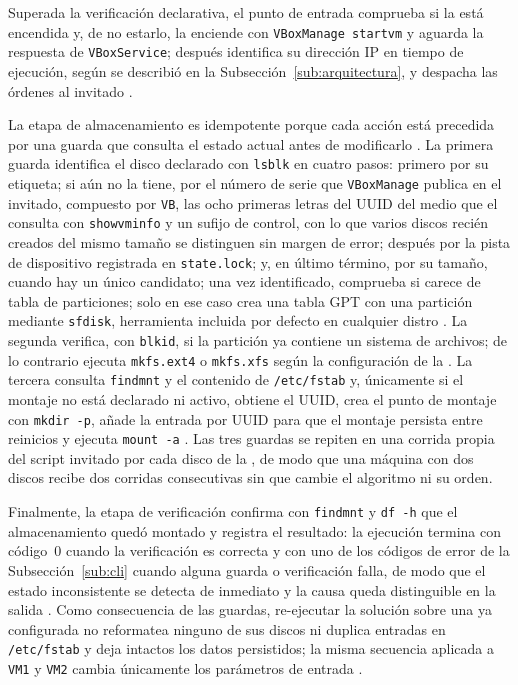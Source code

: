 Superada la verificación declarativa, el punto de entrada comprueba si la \vm{} está encendida y, de no estarlo, la enciende con \texttt{VBoxManage startvm} y aguarda la respuesta de \texttt{VBoxService}; después identifica su dirección IP en tiempo de ejecución, según se describió en la Subsección~\ref{sub:arquitectura}, y despacha las órdenes al invitado \parencite{virtualbox_guestcontrol, virtualbox_guestadditions}.

La etapa de almacenamiento es idempotente porque cada acción está precedida por una guarda que consulta el estado actual antes de modificarlo \parencite{idempotency_concept}. La primera guarda identifica el disco declarado con \texttt{lsblk} en cuatro pasos: primero por su etiqueta; si aún no la tiene, por el número de serie que \texttt{VBoxManage} publica en el invitado, compuesto por \texttt{VB}, las ocho primeras letras del UUID del medio que el \host{} consulta con \texttt{showvminfo} y un sufijo de control, con lo que varios discos recién creados del mismo tamaño se distinguen sin margen de error; después por la pista de dispositivo registrada en \texttt{state.lock}; y, en último término, por su tamaño, cuando hay un único candidato; una vez identificado, comprueba si carece de tabla de particiones; solo en ese caso crea una tabla GPT con una partición mediante \texttt{sfdisk}, herramienta incluida por defecto en cualquier distro \parencite{linux_storage_management}. La segunda verifica, con \texttt{blkid}, si la partición ya contiene un sistema de archivos; de lo contrario ejecuta \texttt{mkfs.ext4} o \texttt{mkfs.xfs} según la configuración de la \vm{}. La tercera consulta \texttt{findmnt} y el contenido de \texttt{/etc/fstab} y, únicamente si el montaje no está declarado ni activo, obtiene el UUID, crea el punto de montaje con \texttt{mkdir -p}, añade la entrada por UUID para que el montaje persista entre reinicios y ejecuta \texttt{mount -a} \parencite{uuid_fstab, lsb_fhs}. Las tres guardas se repiten en una corrida propia del script invitado por cada disco de la \vm{}, de modo que una máquina con dos discos recibe dos corridas consecutivas sin que cambie el algoritmo ni su orden.

Finalmente, la etapa de verificación confirma con \texttt{findmnt} y \texttt{df -h} que el almacenamiento quedó montado y registra el resultado: la ejecución termina con código~0 cuando la verificación es correcta y con uno de los códigos de error de la Subsección~\ref{sub:cli} cuando alguna guarda o verificación falla, de modo que el estado inconsistente se detecta de inmediato y la causa queda distinguible en la salida \parencite{bash_best_practices}. Como consecuencia de las guardas, re-ejecutar la solución sobre una \vm{} ya configurada no reformatea ninguno de sus discos ni duplica entradas en \texttt{/etc/fstab} y deja intactos los datos persistidos; la misma secuencia aplicada a \texttt{VM1} y \texttt{VM2} cambia únicamente los parámetros de entrada \parencite{idempotency_concept, ansible_up_running}.

